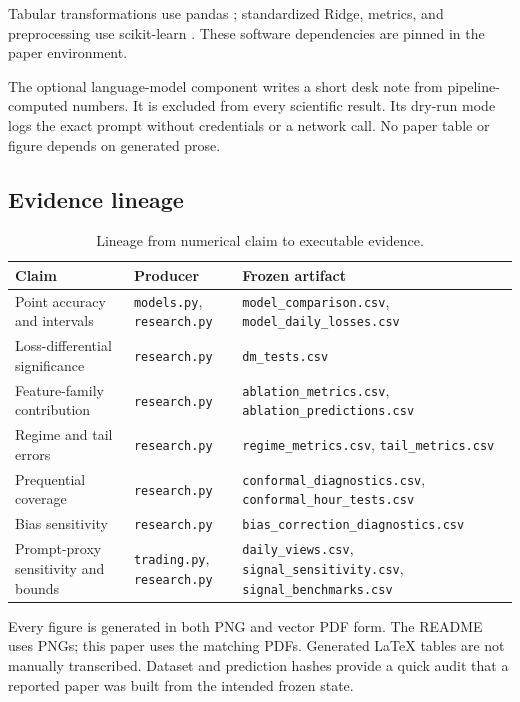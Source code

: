 \documentclass[11pt]{article}
\begin{document}
Tabular transformations use pandas \cite{mckinney2010}; standardized Ridge,
metrics, and preprocessing use scikit-learn \cite{pedregosa2011}. These
software dependencies are pinned in the paper environment.

The optional language-model component writes a short desk note from
pipeline-computed numbers.  It is excluded from every scientific result.  Its
dry-run mode logs the exact prompt without credentials or a network call.  No
paper table or figure depends on generated prose.

\subsection{Evidence lineage}

\begin{table}[H]
\centering
\caption{Lineage from numerical claim to executable evidence.}
\label{tab:lineage}
\small
\begin{tabular}{L{0.27\textwidth}L{0.26\textwidth}L{0.35\textwidth}}
\toprule
Claim & Producer & Frozen artifact \\
\midrule
Point accuracy and intervals & \texttt{models.py}, \texttt{research.py} &
\texttt{model\_comparison.csv}, \texttt{model\_daily\_losses.csv} \\
Loss-differential significance & \texttt{research.py} &
\texttt{dm\_tests.csv} \\
Feature-family contribution & \texttt{research.py} &
\texttt{ablation\_metrics.csv}, \texttt{ablation\_predictions.csv} \\
Regime and tail errors & \texttt{research.py} &
\texttt{regime\_metrics.csv}, \texttt{tail\_metrics.csv} \\
Prequential coverage & \texttt{research.py} &
\texttt{conformal\_diagnostics.csv},
\texttt{conformal\_hour\_tests.csv} \\
Bias sensitivity & \texttt{research.py} &
\texttt{bias\_correction\_diagnostics.csv} \\
Prompt-proxy sensitivity and bounds & \texttt{trading.py},
\texttt{research.py} &
\texttt{daily\_views.csv}, \texttt{signal\_sensitivity.csv},
\texttt{signal\_benchmarks.csv} \\
\bottomrule
\end{tabular}
\end{table}

Every figure is generated in both PNG and vector PDF form.  The README uses
PNGs; this paper uses the matching PDFs.  Generated LaTeX tables are not
manually transcribed.  Dataset and prediction hashes provide a quick audit
that a reported paper was built from the intended frozen state.
\end{document}
